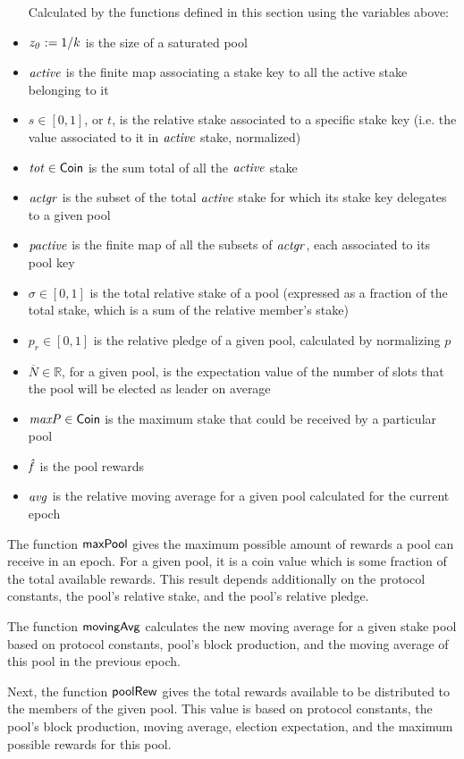 \begin{itemize}
Calculated by the functions defined in this section using the variables above:
\item $\mathit{z_0} := 1/k$ is the size of a saturated pool
\item $\mathit{active}$ is the finite map associating a stake key to all the
active stake belonging to it
\item $s \in [0,1]$, or $t$, is the relative stake associated to a specific stake key
(i.e. the value associated to it in $\mathit{active}$ stake, normalized)
\item $\mathit{tot} \in \mathsf{Coin}$ is the sum total of all the $\mathit{active}$ stake
\item $\mathit{actgr}$ is the subset of the total $\mathit{active}$ stake
for which its stake key delegates to a given pool
\item $\mathit{pactive}$ is the finite map of all the subsets of $\mathit{actgr}$,
each associated to its pool key
\item $\sigma \in [0,1]$ is the total relative stake of a pool (expressed as a fraction of
the total stake, which is a sum of the relative member's stake)
\item $p_r \in [0,1]$ is the relative pledge of a given pool, calculated by normalizing $p$
\item $\overline{N} \in \mathbb{R}$, for a given pool, is the expectation value of the number
of slots that the pool will be elected as leader on average
\item $\mathit{maxP} \in \mathsf{Coin}$ is the maximum stake that could be received by a particular
pool
\item $\mathit{\hat{f}}$ is the pool rewards
\item $\mathit{avg}$ is the relative moving average for a given pool calculated for
the current epoch
\end{itemize}

The function $\mathsf{maxPool}$ gives the maximum possible amount of rewards a pool
can receive in an epoch. For a given pool, it is a coin value which is some fraction of
the total available rewards. This result depends additionally on the protocol
constants, the pool's relative stake, and the pool's relative pledge.

The function $\mathsf{movingAvg}$ calculates the new moving average for a
given stake pool based on protocol constants, pool's block production, and
the moving average of this pool in the previous epoch.

Next, the function $\mathsf{poolRew}$ gives the total rewards available to be distributed
to the members of the given pool. This value is based on protocol constants,
the pool's block production, moving average, election expectation, and the maximum
possible rewards for this pool.


